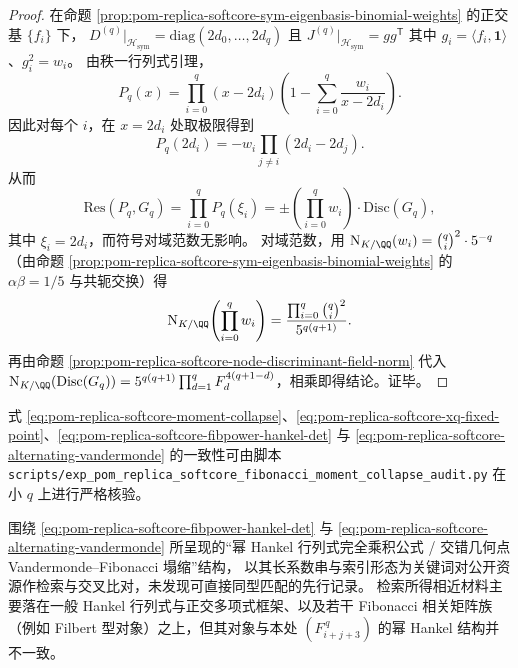 \begin{proof}
在命题 \ref{prop:pom-replica-softcore-sym-eigenbasis-binomial-weights} 的正交基 \(\{f_i\}\) 下，
\(
D^{(q)}|_{\mathcal H_{\mathrm{sym}}}=\mathrm{diag}(2d_0,\dots,2d_q)
\) 且 \(J^{(q)}|_{\mathcal H_{\mathrm{sym}}}=gg^{\mathsf T}\) 其中 \(g_i=\langle f_i,\mathbf{1}\rangle\)、\(g_i^2=w_i\)。
由秩一行列式引理，
\[
P_q(x)=\prod_{i=0}^{q}(x-2d_i)\left(1-\sum_{i=0}^{q}\frac{w_i}{x-2d_i}\right).
\]
因此对每个 \(i\)，在 \(x=2d_i\) 处取极限得到
\[
P_q(2d_i)=-w_i\prod_{j\ne i}(2d_i-2d_j).
\]
从而
\[
\mathrm{Res}(P_q,G_q)
=\prod_{i=0}^{q}P_q(\xi_i)
=\pm\left(\prod_{i=0}^{q}w_i\right)\cdot \mathrm{Disc}(G_q),
\]
其中 \(\xi_i=2d_i\)，而符号对域范数无影响。
对域范数，用 \(\mathrm N_{K/\QQ}(w_i)=\binom{q}{i}^2\cdot 5^{-q}\)（由命题 \ref{prop:pom-replica-softcore-sym-eigenbasis-binomial-weights} 的 \(\alpha\beta=1/5\) 与共轭交换）得
\[
\mathrm N_{K/\QQ}\!\left(\prod_{i=0}^q w_i\right)
=\frac{\prod_{i=0}^q\binom{q}{i}^2}{5^{q(q+1)}}.
\]
再由命题 \ref{prop:pom-replica-softcore-node-discriminant-field-norm} 代入
\(
\mathrm N_{K/\QQ}(\mathrm{Disc}(G_q))=5^{q(q+1)}\prod_{d=1}^q F_d^{4(q+1-d)}
\)，相乘即得结论。证毕。
\end{proof}

\begin{remark}[审计脚本]\label{rem:pom-replica-softcore-fibonacci-moment-collapse-audit-script}
式 \eqref{eq:pom-replica-softcore-moment-collapse}、\eqref{eq:pom-replica-softcore-xq-fixed-point}、\eqref{eq:pom-replica-softcore-fibpower-hankel-det} 与 \eqref{eq:pom-replica-softcore-alternating-vandermonde} 的一致性可由脚本
\texttt{scripts/exp\_pom\_replica\_softcore\_fibonacci\_moment\_collapse\_audit.py}
在小 \(q\) 上进行严格核验。
\end{remark}

\begin{remark}[公开索引的最低限度核验说明]\label{rem:pom-replica-softcore-fibonacci-moment-collapse-public-index-note}
围绕 \eqref{eq:pom-replica-softcore-fibpower-hankel-det} 与 \eqref{eq:pom-replica-softcore-alternating-vandermonde} 所呈现的“幂 Hankel 行列式完全乘积公式 / 交错几何点 Vandermonde--Fibonacci 塌缩”结构，
以其长系数串与索引形态为关键词对公开资源作检索与交叉比对，未发现可直接同型匹配的先行记录。
检索所得相近材料主要落在一般 Hankel 行列式与正交多项式框架、以及若干 Fibonacci 相关矩阵族（例如 Filbert 型对象）之上，但其对象与本处 \( (F_{i+j+3}^{\,q}) \) 的幂 Hankel 结构并不一致。
\end{remark}

\endinput

